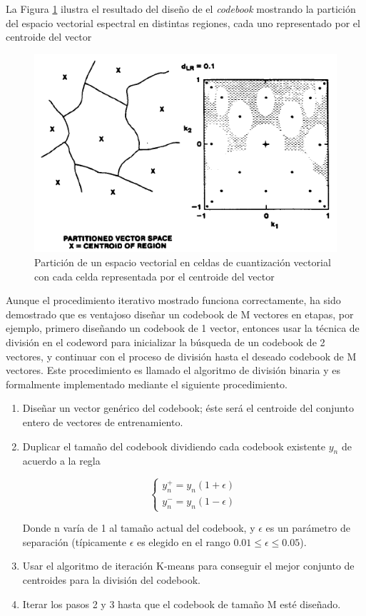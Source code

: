 La Figura \ref{fig:partitioningVectorSpace} ilustra el resultado del diseño de el \textit{codebook} mostrando la partición del espacio vectorial espectral en distintas regiones, cada uno representado por el centroide del vector

\begin{figure}[H]
	\centering
	\includegraphics[width=0.6\linewidth]{figures/partitioningVectorSpace}
	\caption{Partición de un espacio vectorial en celdas de cuantización vectorial con cada celda representada por el centroide del vector}
	\label{fig:partitioningVectorSpace}
\end{figure}
	
Aunque el procedimiento iterativo mostrado funciona correctamente, ha sido demostrado que es ventajoso diseñar un codebook de M vectores en etapas, por ejemplo, primero diseñando un codebook de 1 vector, entonces usar la técnica de división en el codeword para inicializar la búsqueda de un codebook de 2 vectores, y continuar con el proceso de división hasta el deseado codebook de M vectores. Este procedimiento es llamado el algoritmo de división binaria y es formalmente implementado mediante el siguiente procedimiento.
	
\begin{enumerate}
\item	Diseñar un vector genérico del codebook; éste será el centroide del conjunto entero de vectores de entrenamiento.
\item	Duplicar el tamaño del codebook dividiendo cada codebook existente $y_n$ de acuerdo a la regla

\begin{equation}\label{eq:codebook}
	\begin{cases}
	    y_n^+=y_n(1+\epsilon)\\
			    y_n^-=y_n(1-\epsilon)
\end{cases}
\end{equation}

Donde n varía de 1 al tamaño actual del codebook, y $\epsilon$ es un parámetro de separación (típicamente $\epsilon$ es elegido en el rango $0.01\leq \epsilon \leq 0.05$).
\item	Usar el algoritmo de iteración K-means para conseguir el mejor conjunto de centroides para la división del codebook.
\item	Iterar los pasos 2 y 3 hasta que el codebook de tamaño M esté diseñado.
\end{enumerate}

